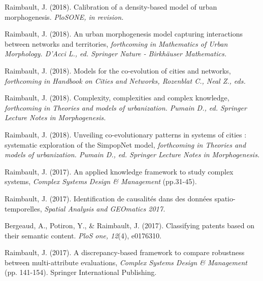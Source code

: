 \bigskip


\noindent Raimbault, J. (2018). Calibration of a density-based model of urban morphogenesis. \textit{PloSONE, in revision.}

\bigskip

\noindent Raimbault, J. (2018). An urban morphogenesis model capturing interactions between networks and territories, \textit{forthcoming in Mathematics of Urban Morphology. D'Acci L., ed. Springer Nature - Birkhäuser Mathematics.}

\bigskip

\noindent Raimbault, J. (2018). Models for the co-evolution of cities and networks, \textit{forthcoming in Handbook on Cities and Networks, Rozenblat C., Neal Z., eds.}

\bigskip

\noindent Raimbault, J. (2018). Complexity, complexities and complex knowledge, \textit{forthcoming in Theories and models of urbanization. Pumain D., ed. Springer Lecture Notes in Morphogenesis.}

\bigskip

\noindent Raimbault, J. (2018). Unveiling co-evolutionary patterns in systems of cities : systematic exploration of the SimpopNet model, \textit{forthcoming in Theories and models of urbanization. Pumain D., ed. Springer Lecture Notes in Morphogenesis.}

\bigskip

\noindent Raimbault, J. (2017). An applied knowledge framework to study complex systems, \textit{Complex Systems Design \& Management} (pp.31-45).

\bigskip

\noindent Raimbault, J. (2017). Identification de causalités dans des données spatio-temporelles, \textit{Spatial Analysis and GEOmatics 2017.}



\bigskip

\noindent Bergeaud, A., Potiron, Y., \& Raimbault, J. (2017). Classifying patents based on their semantic content. \textit{PloS one, 12}(4), e0176310.

\bigskip

\noindent Raimbault, J. (2017). A discrepancy-based framework to compare robustness between multi-attribute evaluations, \textit{Complex Systems Design \& Management} (pp. 141-154). Springer International Publishing. 

